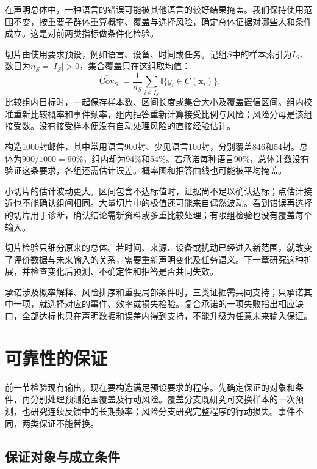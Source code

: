 在声明总体中，一种语言的错误可能被其他语言的较好结果掩盖。我们保持使用范围不变，按重要子群体重算概率、覆盖与选择风险，确定总体证据对哪些人和条件成立。这是对前两类指标做条件化检验。

切片由使用要求预设，例如语言、设备、时间或任务。记组$S$中的样本索引为$I_S$、数目为$n_S=|I_S|>0$，集合覆盖只在这组取均值：
\begin{equation}
 \widehat{\operatorname{Cov}}_S
 =\frac1{n_S}\sum_{i\in I_S}
   \mathbb I\{y_i\in C(\bm{x}_i)\}.
 \label{eq:reliability-group-coverage}
\end{equation}
比较组内目标时，一起保存样本数、区间长度或集合大小及覆盖置信区间。组内校准重新比较概率和事件频率，组内拒答重新计算接受比例与风险；风险分母是该组接受数。没有接受样本便没有自动处理风险的直接经验估计。

构造1000封邮件，其中常用语言900封、少见语言100封，分别覆盖846和54封。总体为$900/1000=90\%$，组内却为94\%和54\%。若承诺每种语言90\%，总体计数没有验证这条要求，各组还需估计误差。概率图和拒答曲线也可能被平均掩盖。

小切片的估计波动更大。区间包含不达标值时，证据尚不足以确认达标；点估计接近也不能确认组间相同。大量切片中的极值还可能来自偶然波动。看到错误再选择的切片用于诊断，确认结论需新资料或多重比较处理；有限组检验也没有覆盖每个输入。

切片检验只细分原来的总体。若时间、来源、设备或扰动已经进入新范围，就改变了评价数据与未来输入的关系，需要重新声明变化及任务语义。下一章研究这种扩展，并检查变化后预测、不确定性和拒答是否共同失效。

承诺涉及概率解释、风险排序和重要局部条件时，三类证据需共同支持；只承诺其中一项，就选择对应的事件、效率或损失检验。复合承诺的一项失败指出相应缺口，全部达标也只在声明数据和误差内得到支持，不能升级为任意未来输入保证。

\section{可靠性的保证}
\label{sec:reliability-guarantee}

前一节检验现有输出，现在要构造满足预设要求的程序。先确定保证的对象和条件，再分别处理预测范围覆盖及行动风险。覆盖分支既研究可交换样本的一次预测，也研究连续反馈中的长期频率；风险分支研究完整程序的行动损失。事件不同，两类保证不能替换。

\subsection{保证对象与成立条件}

